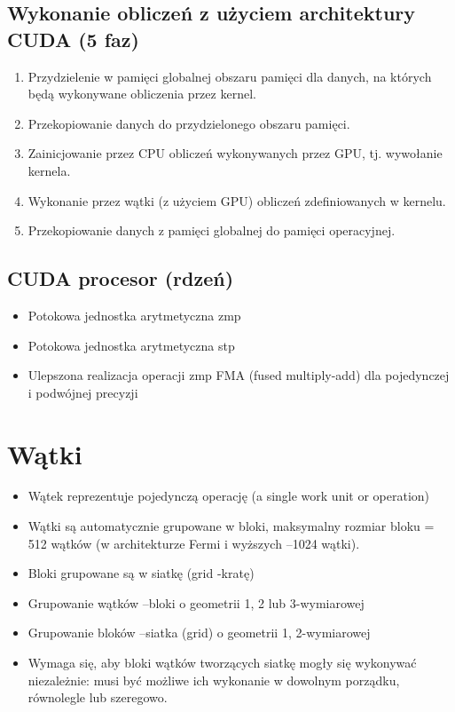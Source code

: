 \documentclass[a4paper,twoside]{article}
\begin{document}
		\subsection*{Wykonanie obliczeń z użyciem architektury CUDA (5 faz)}
		\begin{enumerate}
			\item Przydzielenie w pamięci globalnej obszaru pamięci dla danych, na których będą wykonywane obliczenia przez kernel.
			\item Przekopiowanie danych do przydzielonego obszaru pamięci.
			\item Zainicjowanie przez CPU obliczeń wykonywanych przez GPU, tj. wywołanie kernela.
			\item Wykonanie przez wątki (z użyciem GPU) obliczeń zdefiniowanych w kernelu.
			\item Przekopiowanie danych z pamięci globalnej do pamięci operacyjnej.
		\end{enumerate}
		\subsection*{CUDA procesor (rdzeń)}
		\begin{itemize}
			\item Potokowa jednostka arytmetyczna zmp
			\item Potokowa jednostka arytmetyczna stp
			\item Ulepszona realizacja operacji zmp FMA (fused multiply-add) dla pojedynczej i podwójnej precyzji
		\end{itemize}
		\pagebreak
		\section*{Wątki}
			\begin{itemize}
				\item Wątek reprezentuje pojedynczą operację (a single work unit or operation)
				\item Wątki są automatycznie grupowane w bloki, maksymalny rozmiar bloku = 512 wątków (w architekturze Fermi i wyższych –1024 wątki).
				\item Bloki grupowane są w siatkę (grid -kratę)
				\item Grupowanie wątków –bloki o geometrii 1, 2 lub 3-wymiarowej
				\item Grupowanie bloków –siatka (grid) o geometrii 1, 2-wymiarowej
				\item Wymaga się, aby bloki wątków tworzących siatkę mogły się wykonywać niezależnie: musi być możliwe ich wykonanie w dowolnym porządku, równolegle lub szeregowo.
			\end{itemize}
\end{document}

